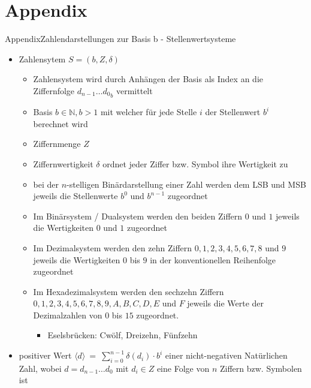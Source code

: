 
\section{Appendix}

\begin{frame}[allowframebreaks]{Appendix}{Zahlendarstellungen zur Basis b - Stellenwertsysteme}
  \begin{itemize}
    \item \alert{Zahlensytem} $S = (b, Z, \delta)$
    \begin{itemize}
  \item Zahlensystem wird durch Anhängen der \alert{Basis als Index} an die Ziffernfolge ${d_{n-1}\ldots d_{0}}_b$ vermittelt
      \item \alert{Basis} $b\in\mathbb{N}, b>1$ mit welcher für jede \alert{Stelle} $i$ der \alert{Stellenwert} $b^i$ berechnet wird
      \item \alert{Ziffernmenge} $Z$
      \item \alert{Ziffernwertigkeit} $\delta$ ordnet jeder \alert{Ziffer} bzw. Symbol ihre \alert{Wertigkeit} zu
    \end{itemize}
    \begin{Sidenote}
      \begin{itemize}
        \item bei der $n$-stelligen Binärdarstellung einer Zahl werden dem \alert{LSB} und \alert{MSB} jeweils die Stellenwerte $b^0$ und $b^{n-1}$ zugeordnet
        \item Im \alert{Binärsystem / Dualsystem} werden den beiden Ziffern $0$ und $1$ jeweils die Wertigkeiten $0$ und $1$ zugeordnet
        \item Im \alert{Dezimalsystem} werden den zehn Ziffern $0, 1, 2, 3, 4, 5, 6, 7, 8$ und $9$ jeweils die Wertigkeiten $0$ bis $9$ in der konventionellen Reihenfolge zugeordnet
        \item Im \alert{Hexadezimalsystem} werden den sechzehn Ziffern $0, 1, 2, 3, 4, 5, 6, 7, 8, 9, A, B, C, D, E$ und $F$ jeweils die Werte der Dezimalzahlen von $0$ bis $15$ zugeordnet.
        \begin{itemize}
          \item \alert{Eselsbrücken:} \alert{C}wölf, \alert{D}reizehn, \alert{F}ünfzehn
        \end{itemize}
    \end{itemize}
\end{Sidenote}
    \item \alert{positiver Wert} $\displaystyle \langle d\rangle\ =\ \sum_{i=0}^{n-1} \delta(d_{i})\cdot b^{i}$ einer \alert{nicht-negativen Natürlichen Zahl}, wobei $d=d_{n-1}\ldots d_0$ mit $d_i\in Z$ eine \alert{Folge} von $n$ \alert{Ziffern} bzw. Symbolen ist
  \end{itemize}
\end{frame}

